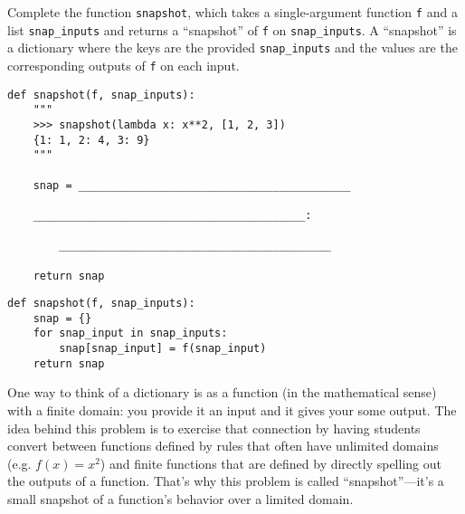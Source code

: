 \begin{blocksection}
\question Complete the function \lstinline{snapshot}, which takes a single-argument function \lstinline{f} and a list \lstinline{snap_inputs} and returns a ``snapshot'' of \lstinline{f} on \lstinline{snap_inputs}. A ``snapshot'' is a dictionary where the keys are the provided \lstinline{snap_inputs} and the values are the corresponding outputs of \lstinline{f} on each input.

\begin{lstlisting}
def snapshot(f, snap_inputs):
    """
    >>> snapshot(lambda x: x**2, [1, 2, 3])
    {1: 1, 2: 4, 3: 9}
    """

    snap = __________________________________________

    __________________________________________:

        __________________________________________
        
    return snap
\end{lstlisting}

\begin{solution}
\begin{lstlisting}
def snapshot(f, snap_inputs):
    snap = {}
    for snap_input in snap_inputs:
        snap[snap_input] = f(snap_input)
    return snap
\end{lstlisting}
\end{solution}
\end{blocksection}

\begin{questionmeta}
One way to think of a dictionary is as a function (in the mathematical sense) with a finite domain: you provide it an input and it gives your some output. The idea behind this problem is to exercise that connection by having students convert between functions defined by rules that often have unlimited domains (e.g. $f(x) = x^2$) and finite functions that are defined by directly spelling out the outputs of a function. That's why this problem is called ``snapshot''---it's a small snapshot of a function's behavior over a limited domain. 
\end{questionmeta}